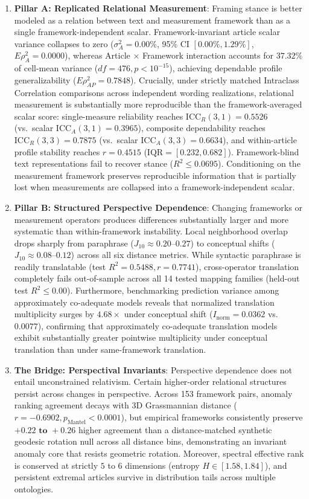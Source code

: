 \begin{enumerate}
    \item \textbf{Pillar A: Replicated Relational Measurement}: Framing stance is better modeled as a relation between text and measurement framework than as a single framework-independent scalar. Framework-invariant article scalar variance collapses to zero ($\sigma^2_A = 0.00\%$, 95\% CI $[0.00\%, 1.29\%]$, $E\rho^2_A = 0.0000$), whereas Article $\times$ Framework interaction accounts for $37.32\%$ of cell-mean variance ($df = 476, p < 10^{-15}$), achieving dependable profile generalizability ($E\rho^2_{AP} = 0.7848$). Crucially, under strictly matched Intraclass Correlation comparisons across independent wording realizations, relational measurement is substantially more reproducible than the framework-averaged scalar score: single-measure reliability reaches $\mathrm{ICC}_R(3,1) = \mathbf{0.5526}$ (vs.\ scalar $\mathrm{ICC}_A(3,1) = 0.3965$), composite dependability reaches $\mathrm{ICC}_R(3,3) = \mathbf{0.7875}$ (vs.\ scalar $\mathrm{ICC}_A(3,3) = 0.6634$), and within-article profile stability reaches $r = \mathbf{0.4515}$ ($\mathrm{IQR} = [0.232, 0.682]$). Framework-blind text representations fail to recover stance ($R^2 \le 0.0695$). Conditioning on the measurement framework preserves reproducible information that is partially lost when measurements are collapsed into a framework-independent scalar.
    \item \textbf{Pillar B: Structured Perspective Dependence}: Changing frameworks or measurement operators produces differences substantially larger and more systematic than within-framework instability. Local neighborhood overlap drops sharply from paraphrase ($J_{10} \approx 0.20$--$0.27$) to conceptual shifts ($J_{10} \approx 0.08$--$0.12$) across all six distance metrics. While syntactic paraphrase is readily translatable (test $R^2 = 0.5488, r = 0.7741$), cross-operator translation completely fails out-of-sample across all 14 tested mapping families (held-out test $R^2 \le 0.00$). Furthermore, benchmarking prediction variance among approximately co-adequate models reveals that normalized translation multiplicity surges by $\mathbf{4.68\times}$ under conceptual shift ($I_{\text{norm}} = 0.0362$ vs.\ $0.0077$), confirming that approximately co-adequate translation models exhibit substantially greater pointwise multiplicity under conceptual translation than under same-framework translation.
    \item \textbf{The Bridge: Perspectival Invariants}: Perspective dependence does not entail unconstrained relativism. Certain higher-order relational structures persist across changes in perspective. Across 153 framework pairs, anomaly ranking agreement decays with 3D Grassmannian distance ($r = -0.6902, p_{\text{Mantel}} < 0.0001$), but empirical frameworks consistently preserve $\mathbf{+0.22 \text{ to } +0.26}$ higher agreement than a distance-matched synthetic geodesic rotation null across all distance bins, demonstrating an invariant anomaly core that resists geometric rotation. Moreover, spectral effective rank is conserved at strictly $5$ to $6$ dimensions (entropy $H \in [1.58, 1.84]$), and persistent extremal articles survive in distribution tails across multiple ontologies.

\end{enumerate}

